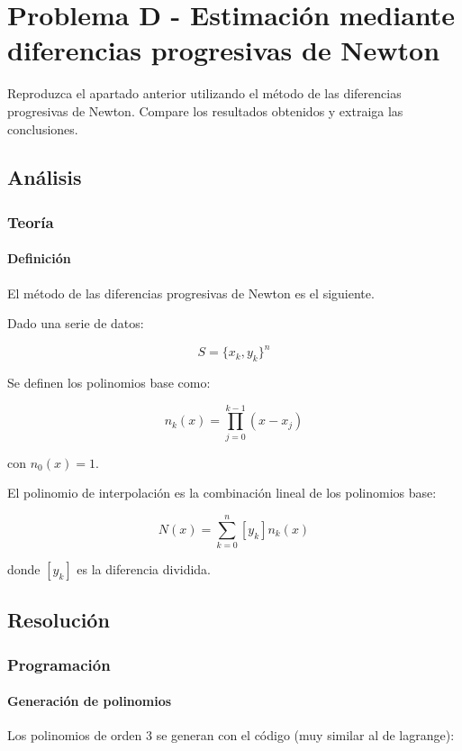 \section{Problema D - Estimación mediante diferencias progresivas de Newton}

Reproduzca el apartado anterior utilizando el método de las diferencias progresivas de Newton. Compare los resultados obtenidos y extraiga las conclusiones.


\subsection{Análisis}

\subsubsection{Teoría}

\paragraph{Definición}
El método de las diferencias progresivas de Newton es el siguiente.

Dado una serie de datos:

$$ S = \{ x_k, y_k \}^n $$

Se definen los polinomios base como: 

\begin{equation}
	n_k(x) = \prod_{j=0}^{k-1} (x - x_j) 
\end{equation}

con $n_0(x) = 1$.

El polinomio de interpolación es la combinación lineal de los polinomios base:

\begin{equation}
	N(x) = \sum_{k=0}^{n} [y_k] n_k(x)
\end{equation}

donde $[y_k]$ es la diferencia dividida.
\newpage

\subsection{Resolución}

\subsubsection{Programación}

\paragraph{Generación de polinomios} Los polinomios de orden 3 se generan con el código (muy similar al de lagrange):

